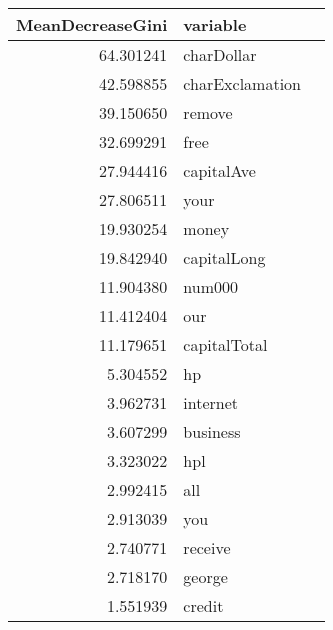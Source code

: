 \documentclass[11pt]{article}
\begin{document}
    \begin{tabular}{r|ll}
 MeanDecreaseGini & variable\\
\hline
	 64.301241       & charDollar     \\
	 42.598855       & charExclamation\\
	 39.150650       & remove         \\
	 32.699291       & free           \\
	 27.944416       & capitalAve     \\
	 27.806511       & your           \\
	 19.930254       & money          \\
	 19.842940       & capitalLong    \\
	 11.904380       & num000         \\
	 11.412404       & our            \\
	 11.179651       & capitalTotal   \\
	  5.304552       & hp             \\
	  3.962731       & internet       \\
	  3.607299       & business       \\
	  3.323022       & hpl            \\
	  2.992415       & all            \\
	  2.913039       & you            \\
	  2.740771       & receive        \\
	  2.718170       & george         \\
	  1.551939       & credit         \\
\end{tabular}
\end{document}
